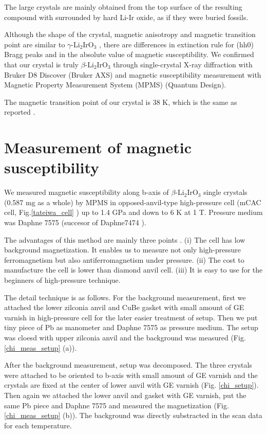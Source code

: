 \documentclass[a4,10.5pt]{report}
\begin{document}
The large crystals are mainly obtained from the top surface of the resulting compound with surrounded by hard Li-Ir oxide,
as if they were buried fossils.

Although the shape of the crystal, magnetic anisotropy and magnetic transition point are similar to $\gamma$-Li$_2$IrO$_3$ \cite{modic2014realization}, 
there are differences in extinction rule for (hh0) Bragg peaks and in the absolute value of magnetic susceptibility.
We confirmed that our crystal is truly $\beta$-Li$_2$IrO$_3$ through single-crystal X-ray diffraction with Bruker D8 Discover (Bruker AXS) 
and magnetic susceptibility measurement with Magnetic Property Measurement System (MPMS) (Quantum Design).

The magnetic transition point of our crystal is 38 K, which is the same as reported \cite{ruiz2017correlated}.

\section{Measurement of magnetic susceptibility}
We measured magnetic susceptibility along b-axis of $\beta$-Li$_2$IrO$_3$ single crystals (0.587 mg as a whole)
by MPMS in opposed-anvil-type high-pressure cell (mCAC cell, Fig.\ref{tateiwa_cell} \cite{Tateiwa2011}) up to 1.4 GPa and down to 6 K at 1 T. 
Pressure medium was Daphne 7575 (succesor of Daphne7474 \cite{Murata2008}). 

The advantages of this method are mainly three points \cite{Tateiwa2011}.
(i) The cell has low background magnetization.
It enables us to measure not only high-pressure ferromagnetism but also antiferromagnetism under pressure.
(ii) The cost to manufacture the cell is lower than diamond anvil cell.
(iii) It is easy to use for the beginners of high-pressure technique.

The detail technique is as follows.
For the background measurement, first we attached the lower zilconia anvil and CuBe gasket 
with small amount of GE varnish in high-pressure cell for the later easier treatment of setup.
Then we put tiny piece of Pb as manometer and Daphne 7575 as pressure medium.
The setup was cloesd with upper zilconia anvil and the background was measured (Fig.\ref{chi_meas_setup} (a)).

After the background measurement, setup was decomposed.
The three crystals were attached to be oriented to b-axis with small amount of GE varnish and the crystals are fixed at the center of lower anvil with GE varnish 
(Fig. \ref{chi_setup}).
Then again we attached the lower anvil and gasket with GE varnish, put the same Pb piece and Daphne 7575 and measured the magnetization (Fig.\ref{chi_meas_setup} (b)).
The background was directly substracted in the scan data for each temperature.
\end{document}
